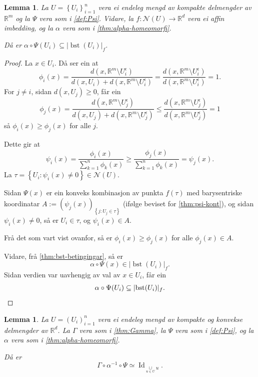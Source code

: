 \documentclass[a4paper, 12pt, norsk]{article}
\theoremstyle{plain}
\newtheorem{lemma}[theorem]{Lemma}
\theoremstyle{definition}
\newcommand{\Rb}{\mathbb{R}}
\newcommand{\Nc}{\mathcal{N}}
\newcommand{\union}{ \mathop{\cup}\limits }
\newcommand{\gr}[1]{ \lvert #1 \rvert } %
\newcommand{\set}[1]{ \left\{ #1 \right\} } %
\newcommand{\tuple}[1]{ \left( #1 \right) } %
\DeclareMathOperator{\bst}{bst} %
\DeclareMathOperator{\Id}{Id} %
\begin{document}
\begin{lemma} \label{thm:Psi-inni-bst}
	La \( U = \set{U_i}_{i=1}^n \) vera ei endeleg mengd av kompakte delmengder av \( \Rb^m \) og la \( \Psi \) vera som i \autoref{def:Psi}. Vidare, la \( f: \Nc(U) \to \Rb^d \) vera ei affin imbedding, og la \( \alpha \) vera som i \autoref{thm:alpha-homeomorfi}.

	Då er \( \alpha \circ \Psi(U_i) \subseteq \gr{\bst(U_i)}_f \).
\end{lemma}

\begin{proof}
	La \( x \in U_i \). Då ser ein at
	\[
		\phi_i(x) = \frac{d(x, \Rb^m \setminus U_i^\epsilon)}{d(x, U_i) + d(x, \Rb^m \setminus U_i^\epsilon)} = \frac{d(x, \Rb^m \setminus U_i^\epsilon)}{d(x, \Rb^m \setminus U_i^\epsilon)} = 1.
	\] 
	For \( j \neq i \), sidan \( d(x, U_j) \geq 0 \), får ein
	\[
		\phi_j(x) = \frac{d(x, \Rb^m \setminus U_j^\epsilon)}{d(x, U_j) + d(x, \Rb^m \setminus U_j^\epsilon)} \leq \frac{d(x, \Rb^m \setminus U_j^\epsilon)}{d(x, \Rb^m \setminus U_j^\epsilon)} = 1
	\]
	så \( \phi_i(x) \geq \phi_j(x) \) for alle \( j \).

	Dette gir at
	\[
		\psi_i(x) = \frac{\phi_i(x)}{\sum_{k=1}^n \phi_k(x)} \geq \frac{\phi_j(x)}{\sum_{k=1}^n \phi_k(x)} = \psi_j(x).
	\]
	La \( \tau = \set{U_i : \psi_i(x) \neq 0} \in \Nc(U) \).

	Sidan \( \Psi(x) \) er ein konveks kombinasjon av punkta \( f(\tau) \) med barysentriske koordinatar \( A:= \tuple{\psi_j(x)}_{\set{ j : U_j\in \tau}} \) (ifølge beviset for \autoref{thm:psi-kont}), og sidan \( \psi_i(x) \neq 0 \), så er \( U_i \in \tau \), og \( \psi_i(x) \in A \).
	
	Frå det som vart vist ovanfor, så er \( \phi_i(x) \geq \phi_j(x) \) for alle \( \phi_j(x) \in A \).
	
	Vidare, frå \autoref{thm:bst-betingingar}, så er
	\[
		\alpha \circ \Psi(x) \in \gr{\bst(U_i)}_f.
	\]
	Sidan verdien var uavhengig av val av \( x \in U_i \), får ein
	\[
		\alpha \circ \Psi(U_i) \subseteq \gr{\bst(U_i)}_f. \qedhere
	\]
\end{proof}

\begin{lemma} \label{thm:homeq-u}
	La \( U = \tuple{U_i}_{i=1}^n \) vera ei endeleg mengd av kompakte og konvekse delmengder av \( \Rb^d \). La \( \Gamma \) vera som i \autoref{thm:Gamma}, la \( \Psi \) vera som i \autoref{def:Psi}, og la \( \alpha \) vera som i \autoref{thm:alpha-homeomorfi}. 
	
	Då er
	\[
		\Gamma \circ \alpha^{-1} \circ \Psi \simeq \Id_{\union_{u \in U} u}.
	\]
\end{lemma}
\end{document}
